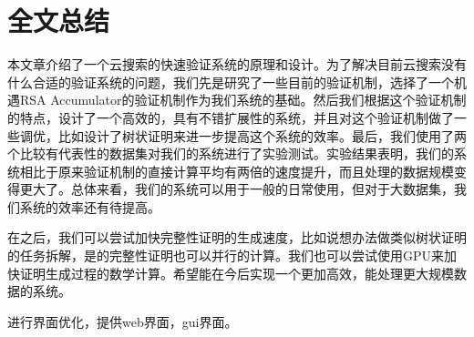 \chapter{全文总结}
\label{chap:conclusion}

本文章介绍了一个云搜索的快速验证系统的原理和设计。为了解决目前云搜索没有什么合适的验证系统的问题，我们先是研究了一些目前的验证机制，选择了一个机遇RSA Accumulator的验证机制作为我们系统的基础。然后我们根据这个验证机制的特点，设计了一个高效的，具有不错扩展性的系统，并且对这个验证机制做了一些调优，比如设计了树状证明来进一步提高这个系统的效率。最后，我们使用了两个比较有代表性的数据集对我们的系统进行了实验测试。实验结果表明，我们的系统相比于原来验证机制的直接计算平均有两倍的速度提升，而且处理的数据规模变得更大了。总体来看，我们的系统可以用于一般的日常使用，但对于大数据集，我们系统的效率还有待提高。

在之后，我们可以尝试加快完整性证明的生成速度，比如说想办法做类似树状证明的任务拆解，是的完整性证明也可以并行的计算。我们也可以尝试使用GPU来加快证明生成过程的数学计算。希望能在今后实现一个更加高效，能处理更大规模数据的系统。

进行界面优化，提供web界面，gui界面。
